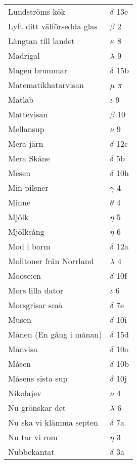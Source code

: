 \documentclass[a6paper,10pt]{article}
\begin{document}
\newpage
\setlength{\oddsidemargin}{-0.37in}
\begin{table}[!h]
\begin{tabular}{l l}
Lundströms kök	&$\delta$ 13e\\
Lyft ditt välförsedda glas&	$\beta$ 2\\
Längtan till landet&	$\kappa$ 8\\
Madrigal&	$\lambda$ 9\\
Magen brummar&	$\delta$ 15b\\
Matematikhatarvisan& $\mu$ $\pi$\\
Matlab	&$\iota$ 9\\
Mattevisan&	$\beta$ 10\\
Mellansup	&$\nu$ 9\\
Mera järn&	$\delta$ 12c\\
Mera Skåne	&$\delta$ 5b\\
Mesen&	$\delta$ 10h\\
Min pilsner	&$\gamma$ 4\\
Minne&	$\theta$ 4\\
Mjölk	&$\eta$ 5\\
Mjölksång&	$\eta$ 6\\
Mod i barm&$\delta$ 12a\\
Molltoner från Norrland&	$\lambda$ 4\\
Moose:en	&$\delta$ 10f\\
Mors lilla dator&	$\iota$ 6\\
Morsgrisar små&	$\delta$ 7e\\
Musen	&$\delta$ 10i\\
Månen (En gång i månan)&	$\delta$ 15d\\
Månvisa&	$\delta$ 10a\\
Måsen	&$\delta$ 10b\\
Måsens sista sup&	$\delta$ 10j\\
Nikolajev	&$\nu$ 4\\
Nu grönskar det&	$\lambda$ 6\\
Nu ska vi klämma septen	&$\delta$ 7a\\
Nu tar vi rom&	$\eta$ 3\\
Nubbekantat&	$\delta$ 3a\\
\end{tabular}
\end{table}
\end{document}
